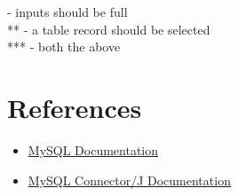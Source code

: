 \documentclass[12pt]{article}
\begin{document}
\noindent * - inputs should be full\\
** - a table record should be selected\\
*** - both the above

\pagebreak



\section{References}
\begin{itemize}
  

\begin{itemize}
    \item \href{https://dev.mysql.com/doc/}{MySQL Documentation}
    \item \href{https://dev.mysql.com/doc/connector-j/en/}{MySQL Connector/J Documentation}
\end{itemize}

\end{itemize}
\end{document}
